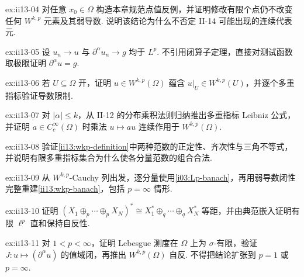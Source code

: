 \begin{FAExercise}[点值不是内禀的]{ex:ii13-04}
对任意 \(\displaystyle x_0\in\Omega\) 构造本章规范点值反例，并证明修改有限个点仍不改变任何 \(\displaystyle W^{k,p}\) 元素及其弱导数. 说明该结论为什么不否定 II-14 可能出现的连续代表元.
\end{FAExercise}

\begin{FAExercise}[弱导数闭性]{ex:ii13-05}
设 \(\displaystyle u_n\to u\) 与 \(\displaystyle\partial^\alpha u_n\to g\) 均于 \(\displaystyle L^p\). 不引用闭算子定理，直接对测试函数取极限证明 \(\displaystyle\partial^\alpha u=g\).
\end{FAExercise}

\begin{FAExercise}[限制/局部性]{ex:ii13-06}
若 \(\displaystyle U\subseteq\Omega\) 开，证明 \(\displaystyle u\in W^{k,p}(\Omega)\) 蕴含 \(\displaystyle u|_U\in W^{k,p}(U)\)，并逐个多重指标验证导数限制.
\end{FAExercise}

\begin{FAExercise}{ex:ii13-07}
对 \(\displaystyle|\alpha|\leqslant k\)，从 II-12 的分布乘积法则归纳推出多重指标 Leibniz 公式，并证明 \(\displaystyle a\in C_c^\infty(\Omega)\) 时乘法 \(\displaystyle u\mapsto au\) 连续作用于 \(\displaystyle W^{k,p}(\Omega)\).
\end{FAExercise}

\begin{FAExercise}[\(\displaystyle W^{k,p}\) 范数]{ex:ii13-08}
验证\autoref{ii13:wkp-definition}中两种范数的正定性、齐次性与三角不等式，并说明有限多重指标集合为什么使各分量范数的组合合法.
\end{FAExercise}

\begin{FAExercise}{ex:ii13-09}
从 \(\displaystyle W^{k,p}\)-Cauchy 列出发，逐分量使用\autoref{i03:Lp-banach}，再用弱导数闭性完整重建\autoref{ii13:wkp-banach}，包括 \(\displaystyle p=\infty\) 情形.
\end{FAExercise}

\begin{FAExercise}[有限直和自反性]{ex:ii13-10}
证明 \(\displaystyle(X_1\oplus_p\cdots\oplus_pX_N)^*\cong X_1^*\oplus_q\cdots\oplus_qX_N^*\) 等距，并由典范嵌入证明有限 \(\displaystyle\ell^p\) 直和保持自反性.
\end{FAExercise}

\begin{FAExercise}{ex:ii13-11}
对 \(\displaystyle1<p<\infty\)，证明 Lebesgue 测度在 \(\displaystyle\Omega\) 上为 \(\displaystyle\sigma\)-有限，验证 \(\displaystyle J:u\mapsto(\partial^\alpha u)\) 的值域闭，再推出 \(\displaystyle W^{k,p}(\Omega)\) 自反. 不得把结论扩张到 \(\displaystyle p=1\) 或 \(\displaystyle p=\infty\).
\end{FAExercise}

